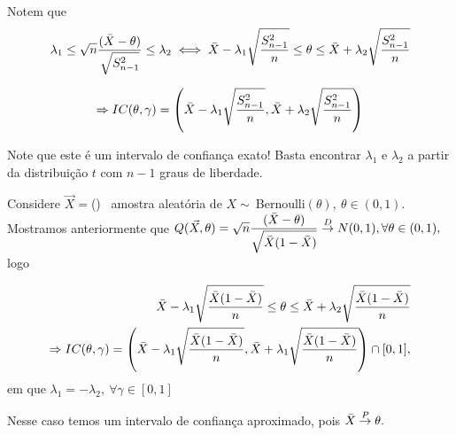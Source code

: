 \documentclass[12pt]{beamer}
\begin{document}
\begin{frame}{}
\begin{block}{}
\justifying
Notem que
\begin{align*}
    \lambda_{1}\leq \sqrt{n}\dfrac{(\Bar{X}-\theta)}{\sqrt{S_{n-1}^{2}}}\leq \lambda_{2}\iff
    \Bar{X}-\lambda_{1}\sqrt{\frac{S_{n-1}^{2}}{n}}\leq \theta \leq \Bar{X}+\lambda_{2}\sqrt{\frac{S_{n-1}^{2}}{n}}
\end{align*}
\end{block}
\pause
\begin{block}{}
\justifying
$$\Rightarrow IC(\theta,\gamma)=\left(\Bar{X}-\lambda_{1}\sqrt{\frac{S_{n-1}^{2}}{n}},\Bar{X}+\lambda_{2}\sqrt{\frac{S_{n-1}^{2}}{n}}\right)$$
\end{block}
\pause
\begin{block}{}
\justifying
Note que este é um intervalo de confiança exato! Basta encontrar $\lambda_{1}$ e $\lambda_{2}$ a partir da distribuição $t$ com $n-1$ graus de liberdade.
\end{block}
\end{frame}

\begin{frame}{}

\begin{block}{}
\justifying
Considere $\Vec{X}=$(\seqX)~ amostra aleatória de $X\sim~$Bernoulli$(\theta),~\theta\in(0,1).$Mostramos anteriormente que $Q(\Vec{X},\theta)=\sqrt{n}\dfrac{(\Bar{X}-\theta)}{\sqrt{\Bar{X}(1-\Bar{X})}}\overset{D}{\rightarrow} N(0,1), \forall \theta \in (0,1),$ logo 
\end{block}
\pause
\begin{block}{}
\justifying
\begin{align*}
    \Bar{X}-\lambda_{1}\sqrt{\dfrac{\Bar{X}(1-\Bar{X})}{n}}\leq \theta \leq \Bar{X}+\lambda_{2}\sqrt{\dfrac{\Bar{X}(1-\Bar{X})}{n}}\\
    \Rightarrow IC(\theta,\gamma)=\left(\Bar{X}-\lambda_{1}\sqrt{\dfrac{\Bar{X}(1-\Bar{X})}{n}},\Bar{X}+\lambda_{1}\sqrt{\dfrac{\Bar{X}(1-\Bar{X})}{n}}\right)\cap[0,1],
\end{align*}
em que $\lambda_{1}=-\lambda_{2},~\forall\gamma\in[0,1]$
\end{block}
\pause
\begin{block}{}
\justifying
Nesse caso temos um intervalo de confiança aproximado, pois $\Bar{X}\overset{P}{\rightarrow} \theta.$
\end{block}
\end{frame}
\end{document}
